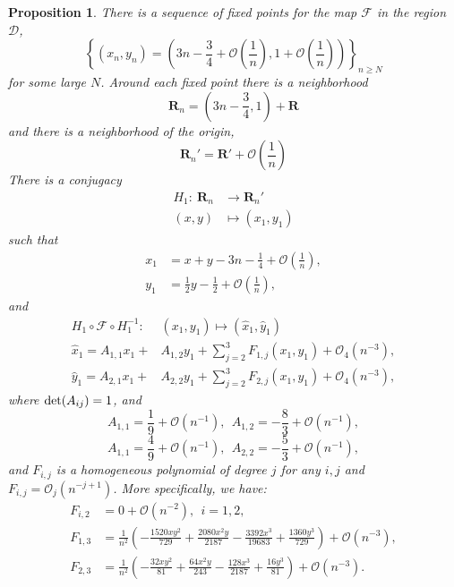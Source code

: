 \documentclass{article}
\numberwithin{figure}{section}
\numberwithin{equation}{section}
\newtheorem{main}{Proposition}
\theoremstyle{remark}
\theoremstyle{definition}
\begin{document}
\begin{main}\label{twisted form near fixed points}
	There is a sequence of fixed points for the map $\mathcal{F}$ in the region $\mathcal{D}$, $$\left\{\left(x_n,y_n\right)=\left(3n-\frac{3}{4}+\mathcal{O}\left(\frac{1}{n}\right),1+\mathcal{O}\left(\frac{1}{n}\right)\right)\right\}_{n\geq N}$$
for some large $N$. Around each fixed point there is a neighborhood 
	$$\mathbf{R}_{n} = \left( 3n - \frac{3}{4} ,1  \right)+\mathbf{R}$$
	and there is a neighborhood of the origin, 
	\[\mathbf{R}_{n}'=\mathbf{R}'+\mathcal{O}\left(\frac{1}{n}\right)\]
	There is a conjugacy
	\begin{align*}
		H_1: \ \mathbf{R}_n &\rightarrow \mathbf{R}_n'\\
		(x,y) & \mapsto (x_1,y_1)
	\end{align*}
	such that	
    \begin{equation}\label{xytoxy}
    \begin{split}
        x_1&=x+y-3n-\frac{1}{4}+\mathcal{O}\left(\frac{1}{n}\right),\\
        y_1&=\frac{1}{2}y-\frac{1}{2}+\mathcal{O}\left(\frac{1}{n}\right),
    \end{split}
\end{equation}
and
	\begin{equation}\label{pre_Birk}
		\begin{split}
			H_1\circ \mathcal{F}\circ H_1^{-1}:&\left( x_{1},y_{1} \right)\mapsto ({\widehat{x}}_{1},{\widehat{y}}_{1})\\
			{\widehat{x}}_{1} = A_{1,1}x_{1} +& A_{1,2}y_{1} + \sum_{j = 2}^{3}{F_{1,j}\left( x_{1},y_{1} \right)}+\mathcal{O}_4\left( n^{- 3} \right),\\
			{\widehat{y}}_{1} = A_{2,1}x_{1} + &A_{2,2}y_{1} + \sum_{j = 2}^{3}{F_{2,j}\left( x_{1},y_{1} \right)}+  \mathcal{O}_4\left( n^{- 3} \right),\end{split}
	\end{equation}
where ${\rm det}(A_{ij})=1$, and
\[A_{1,1} = \frac{1}{9}+\mathcal{ O}\left( n^{- 1} \right),\ \ A_{1,2} = - \frac{8}{3}+\mathcal{O}\left( n^{- 1} \right),\]
\[A_{1,1} = \frac{4}{9}+\mathcal{ O}\left( n^{- 1} \right),\ \ A_{2,2} = - \frac{5}{3}+\mathcal{O}\left( n^{- 1} \right),\]
and $F_{i,j}$ is a homogeneous polynomial of degree $j$ for any $i,j$ and  $F_{i,j}=\mathcal{O}_{j}(n^{-j+1})$.
More specifically, we have:
\begin{equation}\label{Fij}
\begin{split}
      F_{i,2}&=0+\mathcal{O}\left(n^{-2}\right),\ \ i=1,2,\\
      F_{1,3}&=\frac{1}{n^2}\left(-\frac{1520xy^2 }{729}+\frac{2080{x}^2 {y}}{2187}-\frac{3392{x}^3 }{19683}+\frac{1360{y}^3 }{729}\right)+\mathcal{O}\left(n^{-3}\right),\\
      F_{2,3}&=\frac{1}{n^2}\left(-\frac{32{x}{y}^2 }{81}+\frac{64{x}^2 {y}}{243}-\frac{128{x}^3 }{2187}+\frac{16{y}^3 }{81}\right)+\mathcal{O}\left(n^{-3}\right).
      \end{split}
\end{equation}

\end{main}
\end{document}
